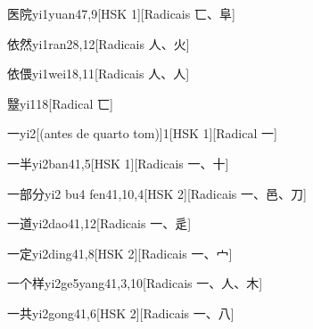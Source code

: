 \begin{entry}{医院}{yi1yuan4}{7,9}[HSK 1][Radicais ⼖、⾩]
\end{entry}

\begin{entry}{依然}{yi1ran2}{8,12}[Radicais ⼈、⽕]
\end{entry}

\begin{entry}{依偎}{yi1wei1}{8,11}[Radicais ⼈、⼈]
\end{entry}

\begin{entry}{毉}{yi1}{18}[Radical ⼖]
\end{entry}

\begin{entry}{一}{yi2}[(antes de quarto tom)]{1}[HSK 1][Radical ⼀]
\end{entry}

\begin{entry}{一半}{yi2ban4}{1,5}[HSK 1][Radicais ⼀、⼗]
\end{entry}

\begin{entry}{一部分}{yi2 bu4 fen4}{1,10,4}[HSK 2][Radicais ⼀、⾢、⼑]
\end{entry}

\begin{entry}{一道}{yi2dao4}{1,12}[Radicais ⼀、⾡]
\end{entry}

\begin{entry}{一定}{yi2ding4}{1,8}[HSK 2][Radicais ⼀、⼧]
\end{entry}

\begin{entry}{一个样}{yi2ge5yang4}{1,3,10}[Radicais ⼀、⼈、⽊]
\end{entry}

\begin{entry}{一共}{yi2gong4}{1,6}[HSK 2][Radicais ⼀、⼋]
\end{entry}

